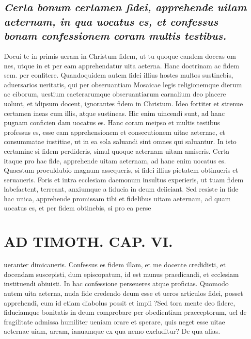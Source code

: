 \documentclass{article}
\begin{document}
\begin{pages}
\subsection*{\textit{Certa bonum certamen fidei, apprehende uitam aeternam, in qua uocatus es, et confessus bonam confessionem coram multis testibus. }}\pstart Docui te in primis ueram in Christum fidem, ut tu quoque eandem doceas om nes, utque in et per eam apprehendatur uita aeterna. Hanc doctrinam ac fidem sem. per confitere. Quandoquidem autem fidei illius hostes multos sustinebis, aduersarios ueritatis, qui per obseruantiam Mosaicae legis religionemque dierum ac ciborum, uestium caeterarumque obseruantiarum carnalium deo placere uolunt, et idipsum docent, ignorantes fidem in Christum. Ideo fortiter et strenue certamen ineas cum illis, atque sustineas. Hic enim uincendi sunt, ad hanc pugnam conficien dam uocatus es. Hanc coram meipso et multis testibus professus es, esse eam apprehensionem et consecutionem uitae aeternae, et consummatae iustitiae, ut in ea sola saluandi sint omnes qui saluantur. In isto certamine si fidem perdideris, simul quoque aeternam uitam amiseris. Certa itaque pro hac fide, apprehende uitam aeternam, ad hanc enim uocatus es. Quaestum proculdubio magnum assequeris, si fidei illius pietatem obtinueris et seruaueris. Foris et intra ecclesiam daemonum insultus experieris, ut tuam fidem labefactent, terreant, anxiumque a fiducia in deum deiiciant. Sed resiste in fide hac unica, apprehende promissam tibi et fidelibus uitam aeternam, ad quam uocatus es, et per fidem obtinebis, si pro ea perse\pend
\section*{AD TIMOTH. CAP. VI. }
\marginpar{[ p.537 ]}\pstart ueranter dimicaueris. Confessus es fidem illam, et me docente credidisti, et docendam suscepisti, dum episcopatum, id est munus praedicandi, et ecclesiam instituendi obiuisti. In hac confessione perseueres atque proficias. Quomodo autem uita aeterna, nuda fide credendo deum esse et ueros articulos fidei, posset apprehendi, cum id etiam diabolus possit et impii ?Sed tora mente deo fidere, fiduciamque bonitatis in deum comprobare per obedientiam praeceptorum, uel de fragilitate admissa humiliter ueniam orare et sperare, quis neget esse uitae aeternae uiam, arram, ianuamque ex qua nemo excluditur? De qua alias.  \pend
{}
{}

\end{pages}
\end{document}
